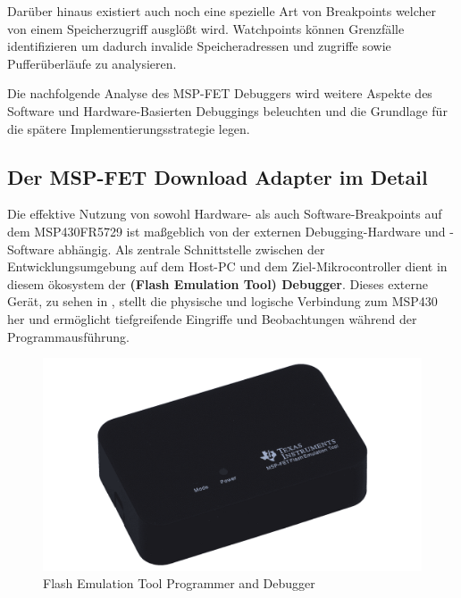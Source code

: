 Dar\"uber hinaus existiert auch noch eine spezielle Art von Breakpoints welcher von einem Speicherzugriff ausgl\"o{\ss}t wird. Watchpoints k\"onnen Grenzf\"alle identifizieren um dadurch invalide Speicheradressen und zugriffe sowie Puffer\"uberl\"aufe zu analysieren. 

Die nachfolgende Analyse des MSP-FET Debuggers wird weitere Aspekte des Software und Hardware-Basierten Debuggings beleuchten und die Grundlage f\"ur die sp\"atere Implementierungsstrategie legen.\AI


\subsection{Der MSP-FET Download Adapter im Detail}
\label{sec:MSP-FET_Debugger}

Die effektive Nutzung von sowohl Hardware- als auch Software-Breakpoints auf dem MSP430FR5729 ist ma{\ss}geblich von der externen Debugging-Hardware und -Software abh\"angig. Als zentrale Schnittstelle zwischen der Entwicklungsumgebung auf dem Host-PC und dem Ziel-Mikrocontroller dient in diesem \"okosystem der \textbf{ (Flash Emulation Tool) Debugger}. Dieses externe Ger\"at, zu sehen in , stellt die physische und logische Verbindung zum MSP430 her und erm\"oglicht tiefgreifende Eingriffe und Beobachtungen w\"ahrend der Programmausf\"uhrung.

\begin{figure}[h!]
	\centering
	\includegraphics[width=1.0\textwidth]{../Bilder/msp_fet.png}
	\caption{Flash Emulation Tool Programmer and Debugger }
	\label{fig:msp_fet}
\end{figure}

